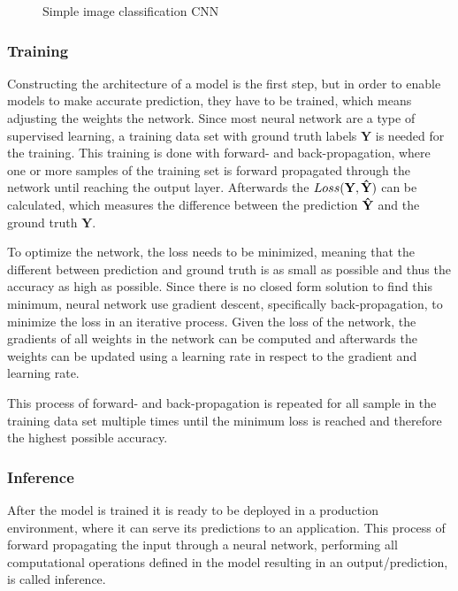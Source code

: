 \begin{figure}[!htb]
    \centering
    \resizebox{.95\linewidth}{!}{}
    \caption{Simple image classification CNN}
    \label{fig:simpleCNN}
\end{figure}

\subsubsection{Training}
Constructing the architecture of a model is the first step, but in order to enable models to make accurate prediction, they have to be trained, which means adjusting the weights the network. 
Since most neural network are a type of supervised learning, a training data set with ground truth labels $\mathbf{Y}$ is needed for the training.
This training is done with forward- and back-propagation, where one or more samples of the training set is forward propagated through the network until reaching the output layer. Afterwards the $Loss\mathbf{(Y,\Hat{Y})}$ can be calculated, which measures the difference between the prediction $\mathbf{\Hat{Y}}$ and the ground truth $\mathbf{Y}$.

To optimize the network, the loss needs to be minimized, meaning that the different between prediction and ground truth is as small as possible and thus the accuracy as high as possible.
Since there is no closed form solution to find this minimum, neural network use gradient descent, specifically back-propagation, to minimize the loss in an iterative process.
Given the loss of the network, the gradients of all weights in the network can be computed and afterwards the weights can be updated using a learning rate in respect to the gradient and learning rate.

This process of forward- and back-propagation is repeated for all sample in the training data set multiple times until the minimum loss is reached and therefore the highest possible accuracy.

\subsubsection{Inference}

After the model is trained it is ready to be deployed in a production environment, where it can serve its predictions to an application. This process of forward propagating the input through a neural network, performing all computational operations defined in the model resulting in an output/prediction, is called inference.

